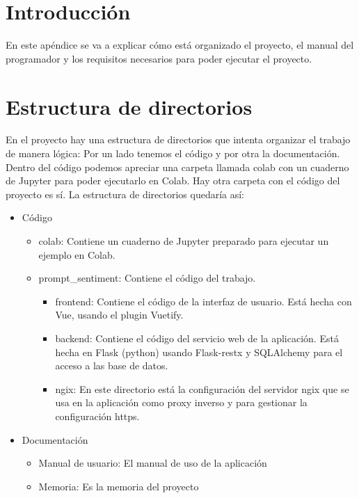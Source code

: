
\section{Introducción}

En este apéndice se va a explicar cómo está organizado el proyecto, el
manual del programador y los requisitos necesarios para poder ejecutar el
proyecto.


\section{Estructura de directorios}

En el proyecto hay una estructura de directorios que intenta organizar el trabajo de manera lógica:
Por un lado tenemos el código y por otra la documentación.
Dentro del código podemos apreciar una carpeta llamada colab con un cuaderno de Jupyter para poder ejecutarlo en Colab.
Hay otra carpeta con el código del proyecto es sí.
La estructura de directorios quedaría así:

\begin{itemize}
	\item Código
	\begin{itemize}
		\item colab: Contiene un cuaderno de Jupyter preparado para ejecutar un ejemplo en Colab.
		\item prompt\_sentiment: Contiene el código del trabajo.
		\begin{itemize}
			\item frontend: Contiene el código de la interfaz de usuario. Está hecha con Vue, usando el plugin Vuetify.
			\item backend: Contiene el código del servicio web de la aplicación. Está hecha en Flask (python) usando Flask-restx y SQLAlchemy para el acceso a las base de datos.
			\item ngix: En este directorio está la configuración del servidor ngix que se usa en la aplicación como proxy inverso y para gestionar la configuración https.
		\end{itemize}
	\end{itemize}
	\item Documentación
	\begin{itemize}
		\item Manual de usuario: El manual de uso de la aplicación
		\item Memoria: Es la memoria del proyecto
	\end{itemize}
\end{itemize}


